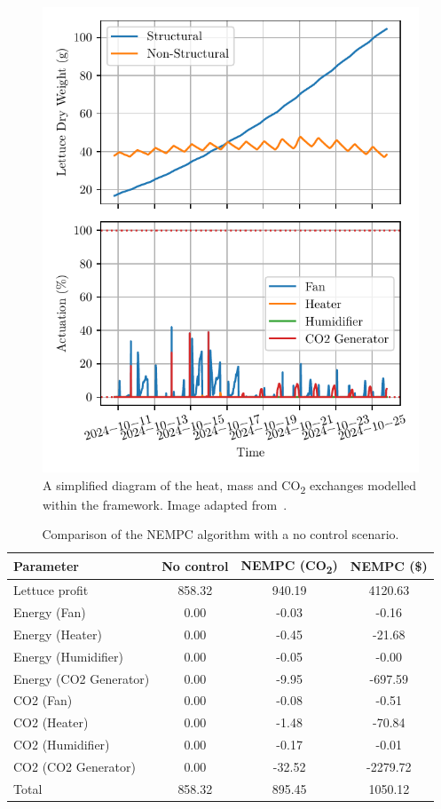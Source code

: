 \documentclass[conference]{IEEEtran}
\begin{document}
\begin{figure}\label{fig:control}
    \centering
    \includegraphics[width=.5\textwidth]{figures/greenhouse_control-mpc-N_5-steps_10801.pdf}
    \caption{A simplified diagram of the heat, mass and CO\textsubscript{2} exchanges modelled within the framework. Image adapted from~\cite{rmward61_2019}.}
\end{figure}

\begin{table}
    \centering
    \caption{Comparison of the NEMPC algorithm with a no control scenario.}\label{tab:comparison}
    \begin{tabular}{lS[table-format=4.2]S[table-format=4.2]S[table-format=4.2]}
        \toprule
        Parameter & {No control} & {NEMPC (CO\textsubscript{2})} & {NEMPC (\$)} \\
        \midrule
        Lettuce profit & 858.32 & 940.19 & 4120.63 \\
        Energy (Fan) & 0.00 & -0.03 & -0.16 \\
        Energy (Heater) & 0.00 & -0.45 & -21.68 \\
        Energy (Humidifier) & 0.00 & -0.05 & -0.00 \\
        Energy (CO2 Generator) & 0.00 & -9.95 & -697.59 \\
        CO2 (Fan) & 0.00 & -0.08 & -0.51 \\
        CO2 (Heater) & 0.00 & -1.48 & -70.84 \\
        CO2 (Humidifier) & 0.00 & -0.17 & -0.01 \\
        CO2 (CO2 Generator) & 0.00 & -32.52 & -2279.72 \\
        \midrule
        Total & 858.32 & 895.45 & 1050.12 \\
        \bottomrule
    \end{tabular}
\end{table}
\end{document}

